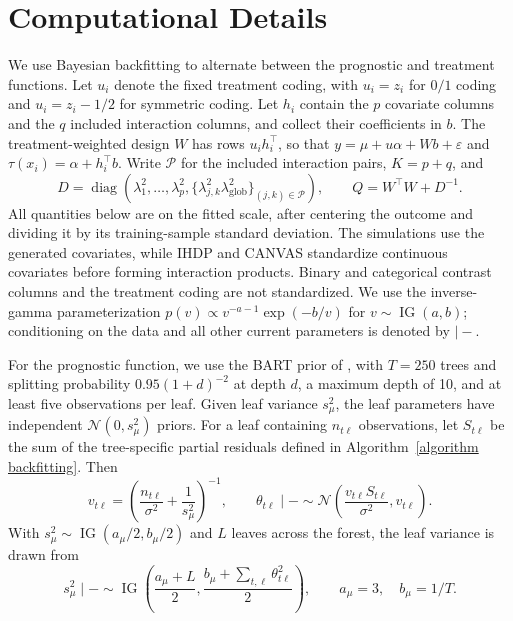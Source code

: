 \documentclass[12pt]{article}
\begin{document}
\FloatBarrier
\section{Computational Details}
\label{sec:full_conditionals}
\label{sec:computational_details}

We use Bayesian backfitting to alternate between the prognostic and treatment
functions. Let $u_i$ denote the fixed treatment coding, with $u_i=z_i$ for
$0/1$ coding and $u_i=z_i-1/2$ for symmetric coding. Let $h_i$ contain the
$p$ covariate columns and the $q$ included interaction columns, and collect
their coefficients in $b$. The treatment-weighted design $W$ has rows
$u_i h_i^\top$, so that $y=\mu+u\alpha+Wb+\varepsilon$ and
$\tau(x_i)=\alpha+h_i^\top b$. Write $\mathcal P$ for the included interaction pairs, $K=p+q$, and
\[
 D=\operatorname{diag}\left(\lambda_1^2,\ldots,\lambda_p^2,
       \{\lambda_{j,k}^2\lambda_{\mathrm{glob}}^2\}_{(j,k)\in\mathcal P}\right),
 \qquad Q=W^\top W+D^{-1}.
\]
All quantities below are on the fitted scale, after centering the outcome and dividing it by its training-sample standard deviation. The simulations use the generated covariates, while IHDP and CANVAS standardize continuous covariates before forming interaction products. Binary and categorical contrast columns and the treatment coding are not standardized. We use the inverse-gamma
parameterization $p(v)\propto v^{-a-1}\exp(-b/v)$ for
$v\sim\operatorname{IG}(a,b)$; conditioning on the data and all other
current parameters is denoted by $\mid -$.

For the prognostic function, we use the BART prior of
\citet{chipman2010bart}, with $T=250$ trees and splitting probability
$0.95(1+d)^{-2}$ at depth $d$, a maximum depth of 10, and at least five
observations per leaf. Given leaf variance $s_\mu^2$, the leaf parameters
have independent $\mathcal N(0,s_\mu^2)$ priors. For a leaf containing
$n_{t\ell}$ observations, let $S_{t\ell}$ be the sum of the tree-specific
partial residuals defined in Algorithm~\ref{algorithm backfitting}. Then
\begin{equation}
 v_{t\ell}=\left(\frac{n_{t\ell}}{\sigma^2}+\frac{1}{s_\mu^2}\right)^{-1},
 \qquad
 \theta_{t\ell}\mid -\sim
 \mathcal N\left(\frac{v_{t\ell}S_{t\ell}}{\sigma^2},v_{t\ell}\right).
 \label{eq:fc_leaf}
\end{equation}
With $s_\mu^2\sim\operatorname{IG}(a_\mu/2,b_\mu/2)$ and $L$ leaves
across the forest, the leaf variance is drawn from
\begin{equation}
 s_\mu^2\mid -\sim\operatorname{IG}\left(
 \frac{a_\mu+L}{2},\frac{b_\mu+\sum_{t,\ell}\theta_{t\ell}^2}{2}\right),
 \qquad a_\mu=3,\quad b_\mu=1/T.
 \label{eq:fc_leaf_scale}
\end{equation}
\end{document}

